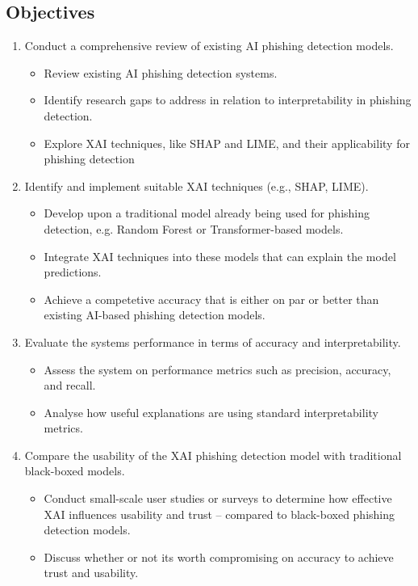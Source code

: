 \subsection*{Objectives}

\begin{enumerate}
    \item Conduct a comprehensive review of existing AI phishing detection models.
        \begin{itemize}
            \item Review existing AI phishing detection systems.
            \item Identify research gaps to address in relation to interpretability in phishing detection.
            \item Explore XAI techniques, like SHAP and LIME, and their applicability for phishing detection
        \end{itemize}
    \item Identify and implement suitable XAI techniques (e.g., SHAP, LIME).
        \begin{itemize}
            \item Develop upon a traditional model already being used for phishing detection, e.g. Random Forest or Transformer-based models.
            \item Integrate XAI techniques into these models that can explain the model predictions.
            \item Achieve a competetive accuracy that is either on par or better than existing AI-based phishing detection models.
        \end{itemize}
    \item Evaluate the system\textquotesingle s performance in terms of accuracy and interpretability.
        \begin{itemize}
            \item Assess the system on performance metrics such as precision, accuracy, and recall.
            \item Analyse how useful explanations are using standard interpretability metrics.
        \end{itemize}
    \item Compare the usability of the XAI phishing detection model with traditional black-boxed models.
        \begin{itemize}
            \item Conduct small-scale user studies or surveys to determine how effective XAI influences usability and trust -- compared to black-boxed phishing detection models.
            \item Discuss whether or not its worth compromising on accuracy to achieve trust and usability.
        \end{itemize}
\end{enumerate}
